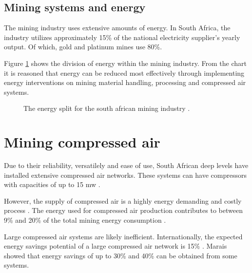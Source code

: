 \subsection{Mining systems and energy}
The mining industry uses extensive amounts of energy. In South Africa, the industry utilizes approximately 15\% of the national electricity supplier's yearly output. Of which, gold and platinum mines use 80\%.\cite{Eskom2010Energy}\par
Figure \ref{fig: Energy Split} shows the division of energy within the mining industry. From the chart it is reasoned that energy can be reduced most effectively through implementing energy interventions on mining material handling, processing and compressed air systems.
\begin{figure}[h]
	\centering
	\caption[The energy split for the south african mining industry.]{The energy split for the south african mining industry \cite{Eskom2010Energy}.}
	\label{fig: Energy Split}
\end{figure}
\par
\section{Mining compressed air}
Due to their reliability, versatilely and ease of use, South African deep levels have installed extensive compressed air networks. These systems can have compressors with capacities of up to 15 \gls{mw} \cite{Marais2012PhD}.\par
However, the supply of compressed air is a highly energy demanding and costly process \cite{padachi2009energy}.  The energy used for compressed air production contributes to between 9\% and 20\% of the total mining energy consumption \cite{Eskom2010Energy,du2011development}. \par
Large compressed air systems are likely inefficient. Internationally, the expected energy savings potential of a large compressed air network is 15\% \cite{neale2009compressed}. Marais \cite{marais2013simplification} showed that energy savings of up to 30\% and 40\% can be obtained from some systems. 
